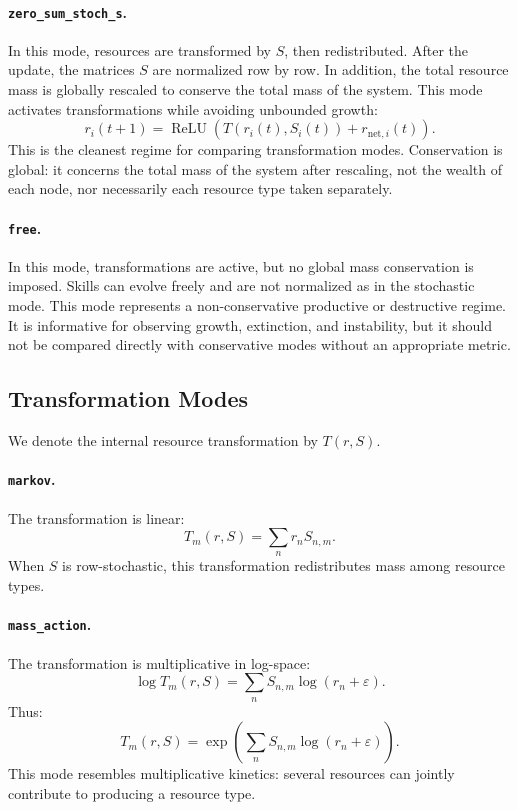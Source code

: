 \documentclass[11pt]{article}
\begin{document}
\paragraph{\texttt{zero\_sum\_stoch\_s}.}
In this mode, resources are transformed by $S$, then redistributed. After the update, the matrices $S$ are normalized row by row. In addition, the total resource mass is globally rescaled to conserve the total mass of the system. This mode activates transformations while avoiding unbounded growth:
\begin{equation}
    r_i(t+1) = \operatorname{ReLU}\left(T(r_i(t),S_i(t)) + r_{\mathrm{net},i}(t)\right).
\end{equation}
This is the cleanest regime for comparing transformation modes. Conservation is global: it concerns the total mass of the system after rescaling, not the wealth of each node, nor necessarily each resource type taken separately.

\paragraph{\texttt{free}.}
In this mode, transformations are active, but no global mass conservation is imposed. Skills can evolve freely and are not normalized as in the stochastic mode. This mode represents a non-conservative productive or destructive regime. It is informative for observing growth, extinction, and instability, but it should not be compared directly with conservative modes without an appropriate metric.

\subsection{Transformation Modes}

We denote the internal resource transformation by $T(r,S)$.

\paragraph{\texttt{markov}.}
The transformation is linear:
\begin{equation}
    T_m(r,S) = \sum_n r_n S_{n,m}.
\end{equation}
When $S$ is row-stochastic, this transformation redistributes mass among resource types.

\paragraph{\texttt{mass\_action}.}
The transformation is multiplicative in log-space:
\begin{equation}
    \log T_m(r,S) = \sum_n S_{n,m} \log(r_n + \varepsilon).
\end{equation}
Thus:
\begin{equation}
    T_m(r,S) = \exp\left(\sum_n S_{n,m}\log(r_n+\varepsilon)\right).
\end{equation}
This mode resembles multiplicative kinetics: several resources can jointly contribute to producing a resource type.
\end{document}
